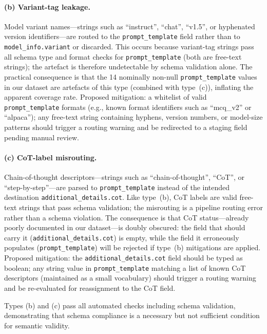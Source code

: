 \documentclass[11pt]{article}
\begin{document}
\paragraph{(b) Variant-tag leakage.}
Model variant names---strings such as ``instruct'', ``chat'',
``v1.5'', or hyphenated version identifiers---are routed to the
\texttt{prompt\_template} field rather than to
\texttt{model\_info.variant} or discarded. This occurs because
variant-tag strings pass all schema type and format checks for
\texttt{prompt\_template} (both are free-text strings); the
artefact is therefore undetectable by schema validation alone.
The practical consequence is that the 14 nominally non-null
\texttt{prompt\_template} values in our dataset are artefacts of
this type (combined with type~(c)), inflating the apparent
coverage rate. Proposed mitigation: a whitelist of valid
\texttt{prompt\_template} formats (e.g., known format identifiers
such as ``mcq\_v2'' or ``alpaca''); any free-text string
containing hyphens, version numbers, or model-size patterns
should trigger a routing warning and be redirected to a
staging field pending manual review.

\paragraph{(c) CoT-label misrouting.}
Chain-of-thought descriptors---strings such as ``chain-of-thought'',
``CoT'', or ``step-by-step''---are parsed to
\texttt{prompt\_template} instead of the intended destination
\texttt{additional\_details.cot}. Like type~(b), CoT labels
are valid free-text strings that pass schema validation; the
misrouting is a pipeline routing error rather than a schema
violation. The consequence is that CoT status---already poorly
documented in our dataset---is doubly obscured: the field that
should carry it (\texttt{additional\_details.cot}) is empty,
while the field it erroneously populates
(\texttt{prompt\_template}) will be rejected if type~(b)
mitigations are applied. Proposed mitigation: the
\texttt{additional\_details.cot} field should be typed as
boolean; any string value in \texttt{prompt\_template} matching
a list of known CoT descriptors (maintained as a small vocabulary)
should trigger a routing warning and be re-evaluated for
reassignment to the CoT field.

Types (b) and (c) pass all automated checks including schema
validation, demonstrating that schema compliance is a necessary
but not sufficient condition for semantic validity.
\end{document}
